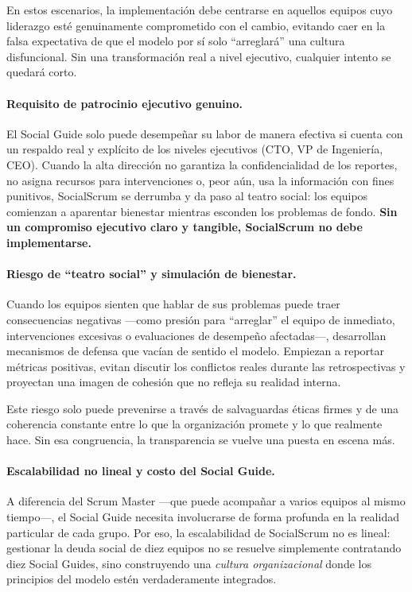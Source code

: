 En estos escenarios, la implementación debe centrarse en aquellos equipos cuyo liderazgo esté genuinamente comprometido con el cambio, evitando caer en la falsa expectativa de que el modelo por sí solo ``arreglará'' una cultura disfuncional. Sin una transformación real a nivel ejecutivo, cualquier intento se quedará corto.

\paragraph{Requisito de patrocinio ejecutivo genuino.}
El Social Guide solo puede desempeñar su labor de manera efectiva si cuenta con un respaldo real y explícito de los niveles ejecutivos (CTO, VP de Ingeniería, CEO). Cuando la alta dirección no garantiza la confidencialidad de los reportes, no asigna recursos para intervenciones o, peor aún, usa la información con fines punitivos, SocialScrum se derrumba y da paso al teatro social: los equipos comienzan a aparentar bienestar mientras esconden los problemas de fondo.
\textbf{Sin un compromiso ejecutivo claro y tangible, SocialScrum no debe implementarse.}

\paragraph{Riesgo de ``teatro social'' y simulación de bienestar.}
Cuando los equipos sienten que hablar de sus problemas puede traer consecuencias negativas —como presión para ``arreglar'' el equipo de inmediato, intervenciones excesivas o evaluaciones de desempeño afectadas—, desarrollan mecanismos de defensa que vacían de sentido el modelo. Empiezan a reportar métricas positivas, evitan discutir los conflictos reales durante las retrospectivas y proyectan una imagen de cohesión que no refleja su realidad interna.

Este riesgo solo puede prevenirse a través de salvaguardas éticas firmes y de una coherencia constante entre lo que la organización promete y lo que realmente hace. Sin esa congruencia, la transparencia se vuelve una puesta en escena más.

\paragraph{Escalabilidad no lineal y costo del Social Guide.}
A diferencia del Scrum Master —que puede acompañar a varios equipos al mismo tiempo—, el Social Guide necesita involucrarse de forma profunda en la realidad particular de cada grupo. Por eso, la escalabilidad de SocialScrum no es lineal: gestionar la deuda social de diez equipos no se resuelve simplemente contratando diez Social Guides, sino construyendo una \emph{cultura organizacional} donde los principios del modelo estén verdaderamente integrados.

